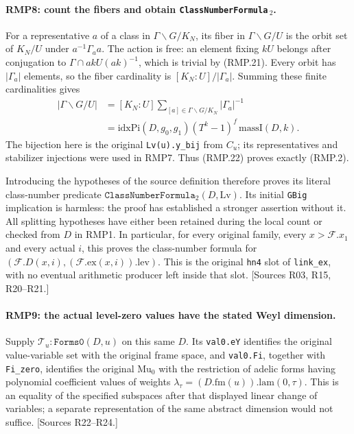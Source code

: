 \paragraph{RMP8: count the fibers and obtain \texttt{ClassNumberFormula}$\,{}_2$.}
\label{claim:RMP8}
For a representative $a$ of a class in $\Gamma\backslash G/K_N$,
its fiber in $\Gamma\backslash G/U$ is the orbit set of $K_N/U$
under $a^{-1}\Gamma_a a$. The action is free: an element fixing
$kU$ belongs after conjugation to $\Gamma\cap akU(ak)^{-1}$,
which is trivial by (RMP.21). Every orbit has $|\Gamma_a|$
elements, so the fiber cardinality is $[K_N:U]/|\Gamma_a|$.
Summing these finite cardinalities gives
\[
 \begin{split}
 |\Gamma\backslash G/U|
   &=[K_N:U]\sum_{[a]\in\Gamma\backslash G/K_N}|\Gamma_a|^{-1}\\
   &=\mathrm{idxPi}(D,g_0,g_1)(T^k-1)^f\,
                                      \mathrm{massI}(D,k).
 \end{split}                                                     \tag{RMP.22}
\]
The bijection here is the original \texttt{Lv(u).y\_bij} from
$C_u$; its representatives and stabilizer injections were used in
RMP7. Thus (RMP.22) proves exactly (RMP.2).

Introducing the hypotheses of the source definition therefore
proves its literal class-number predicate
$\texttt{ClassNumberFormula}_2(D,\mathrm{Lv})$.
Its initial \texttt{GBig} implication is harmless: the proof
has established a stronger assertion without it. All splitting
hypotheses have either been retained during the local count or
checked from $D$ in RMP1. In particular, for every original family,
every $x>\mathcal F.x_1$ and every actual $i$, this proves the
class-number formula for
$(\mathcal F.D(x,i),(\mathcal F.\mathrm{ex}(x,i)).\mathrm{lev})$.
This is the original \texttt{hn4} slot of \texttt{link\_ex},
with no eventual arithmetic producer left inside that slot.
[Sources R03, R15, R20--R21.]

\paragraph{RMP9: the actual level-zero values have the stated Weyl dimension.}
\label{claim:RMP9}
Supply $\mathcal T_u:\texttt{Forms0}(D,u)$ on this same $D$.
Its \texttt{val0.eY} identifies the original value-variable set
with the original frame space, and \texttt{val0.Fi}, together
with \texttt{Fi\_zero}, identifies the original $\mathrm{Mu}_0$
with the restriction of adelic forms having polynomial coefficient
values of weights
$\lambda_\tau=(D.\mathrm{fm}(u)).\mathrm{lam}(0,\tau)$.
This is an equality of the specified subspaces after that displayed
linear change of variables; a separate representation of the same
abstract dimension would not suffice. [Sources R22--R24.]

